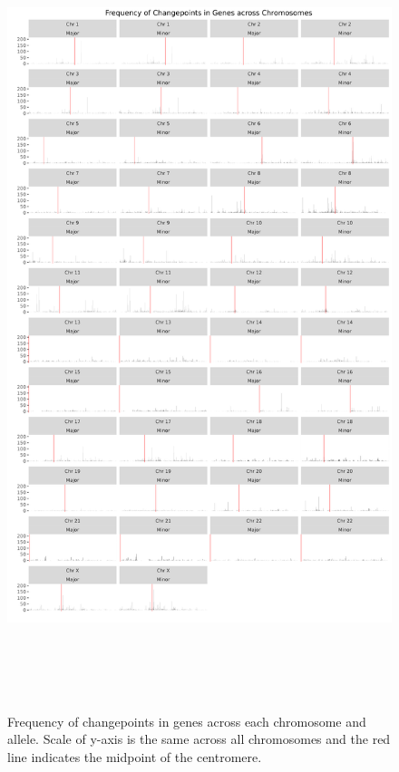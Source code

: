 \begin{figure}[H]
\centering

\includegraphics[width = 1\textwidth, height = 23cm]{../figures/Chapter_6/All_Genes_Barplot.png}

\caption[Frequency of changepoints in genes across each chromosome and allele.]{Frequency of changepoints in genes across each chromosome and allele. Scale of y-axis is the same across all chromosomes and the red line indicates the midpoint of the centromere.}
\label{fig:Barplot_Total}
\end{figure}

